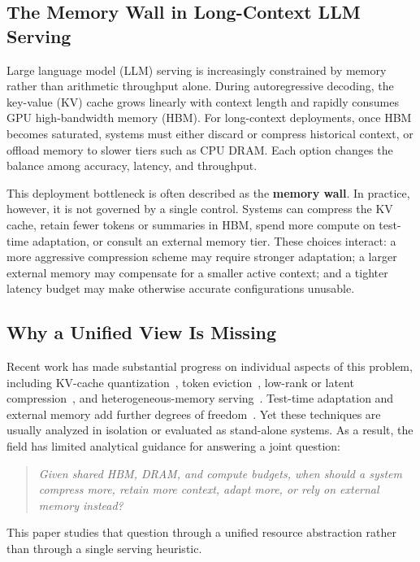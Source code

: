 \documentclass[11pt,a4paper]{article}
\theoremstyle{plain}
\theoremstyle{definition}
\begin{document}
\subsection{The Memory Wall in Long-Context LLM Serving}
Large language model (LLM) serving is increasingly constrained by memory rather than arithmetic throughput alone. During autoregressive decoding, the key-value (KV) cache grows linearly with context length and rapidly consumes GPU high-bandwidth memory (HBM). For long-context deployments, once HBM becomes saturated, systems must either discard or compress historical context, or offload memory to slower tiers such as CPU DRAM. Each option changes the balance among accuracy, latency, and throughput.

This deployment bottleneck is often described as the \textbf{memory wall}. In practice, however, it is not governed by a single control. Systems can compress the KV cache, retain fewer tokens or summaries in HBM, spend more compute on test-time adaptation, or consult an external memory tier. These choices interact: a more aggressive compression scheme may require stronger adaptation; a larger external memory may compensate for a smaller active context; and a tighter latency budget may make otherwise accurate configurations unusable.

\subsection{Why a Unified View Is Missing}
Recent work has made substantial progress on individual aspects of this problem, including KV-cache quantization~\cite{liu2024kivi,hooper2024kvquant,sharma2025minikv}, token eviction~\cite{zhang2023h2o,xiao2024streamingllm,tang2024quest,yuan2024adakv}, low-rank or latent compression~\cite{deepseek2024mla,chang2025palu,ji2026echokv}, and heterogeneous-memory serving~\cite{kwon2023,sheng2023,fang2025}. Test-time adaptation and external memory add further degrees of freedom~\cite{sun2020,kuratov2026gradmem}. Yet these techniques are usually analyzed in isolation or evaluated as stand-alone systems. As a result, the field has limited analytical guidance for answering a joint question:

\begin{quote}
\emph{Given shared HBM, DRAM, and compute budgets, when should a system compress more, retain more context, adapt more, or rely on external memory instead?}
\end{quote}

This paper studies that question through a unified resource abstraction rather than through a single serving heuristic.
\end{document}
